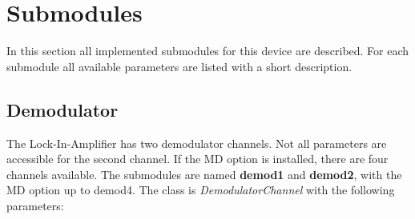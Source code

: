 \documentclass[11pt]{article} %
\begin{document}
\section{Submodules}

In this section all implemented submodules for this device are described. For each submodule all available parameters are listed with a short description.

\subsection{Demodulator}
The Lock-In-Amplifier has two demodulator channels. Not all parameters are accessible for the second channel. If the MD option is installed, there are four channels available. The submodules are named {\bf demod1} and {\bf demod2}, \small{with the MD option up to demod4}. The class is {\it DemodulatorChannel} with the following parameters:
\end{document}
